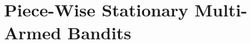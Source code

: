 

\chapter{Piece-Wise Stationary Multi-Armed Bandits}
\label{chapter:6}

\graphicspath{{2-Chapters/6-Chapter/Images/}}

